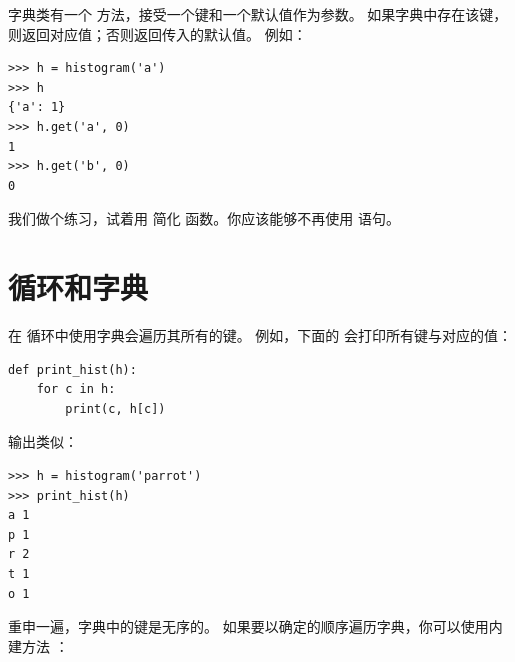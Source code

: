字典类有一个  方法，接受一个键和一个默认值作为参数。
如果字典中存在该键，则返回对应值；否则返回传入的默认值。 例如：

\begin{lstlisting}
>>> h = histogram('a')
>>> h
{'a': 1}
>>> h.get('a', 0)
1
>>> h.get('b', 0)
0
\end{lstlisting}

%

我们做个练习，试着用  简化  函数。你应该能够不再使用  语句。


\section{循环和字典}

  


在  循环中使用字典会遍历其所有的键。
例如，下面的  会打印所有键与对应的值：

\begin{lstlisting}
def print_hist(h):
    for c in h:
        print(c, h[c])
\end{lstlisting}

%

输出类似：

\begin{lstlisting}
>>> h = histogram('parrot')
>>> print_hist(h)
a 1
p 1
r 2
t 1
o 1
\end{lstlisting}

%

重申一遍，字典中的键是无序的。
如果要以确定的顺序遍历字典，你可以使用内建方法 ：

  

